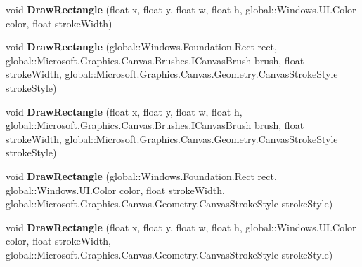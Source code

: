 \begin{DoxyCompactItemize}
\item 
\mbox{\label{interface_microsoft_1_1_graphics_1_1_canvas_1_1_i_canvas_drawing_session_a3633aafe8dc2c5aa03e05c858a1b0802}} 
void {\bfseries Draw\+Rectangle} (float x, float y, float w, float h, global\+::\+Windows.\+U\+I.\+Color color, float stroke\+Width)
\item 
\mbox{\label{interface_microsoft_1_1_graphics_1_1_canvas_1_1_i_canvas_drawing_session_a298251ae7a182d7041d97d9da8758781}} 
void {\bfseries Draw\+Rectangle} (global\+::\+Windows.\+Foundation.\+Rect rect, global\+::\+Microsoft.\+Graphics.\+Canvas.\+Brushes.\+I\+Canvas\+Brush brush, float stroke\+Width, global\+::\+Microsoft.\+Graphics.\+Canvas.\+Geometry.\+Canvas\+Stroke\+Style stroke\+Style)
\item 
\mbox{\label{interface_microsoft_1_1_graphics_1_1_canvas_1_1_i_canvas_drawing_session_ae3c965e98ad619649d1740114ea65691}} 
void {\bfseries Draw\+Rectangle} (float x, float y, float w, float h, global\+::\+Microsoft.\+Graphics.\+Canvas.\+Brushes.\+I\+Canvas\+Brush brush, float stroke\+Width, global\+::\+Microsoft.\+Graphics.\+Canvas.\+Geometry.\+Canvas\+Stroke\+Style stroke\+Style)
\item 
\mbox{\label{interface_microsoft_1_1_graphics_1_1_canvas_1_1_i_canvas_drawing_session_a44f123ddca8e9582ef8859358cb43c33}} 
void {\bfseries Draw\+Rectangle} (global\+::\+Windows.\+Foundation.\+Rect rect, global\+::\+Windows.\+U\+I.\+Color color, float stroke\+Width, global\+::\+Microsoft.\+Graphics.\+Canvas.\+Geometry.\+Canvas\+Stroke\+Style stroke\+Style)
\item 
\mbox{\label{interface_microsoft_1_1_graphics_1_1_canvas_1_1_i_canvas_drawing_session_a076b55543b9248eaf8df01b43faaae55}} 
void {\bfseries Draw\+Rectangle} (float x, float y, float w, float h, global\+::\+Windows.\+U\+I.\+Color color, float stroke\+Width, global\+::\+Microsoft.\+Graphics.\+Canvas.\+Geometry.\+Canvas\+Stroke\+Style stroke\+Style)
\item 

\end{DoxyCompactItemize}
